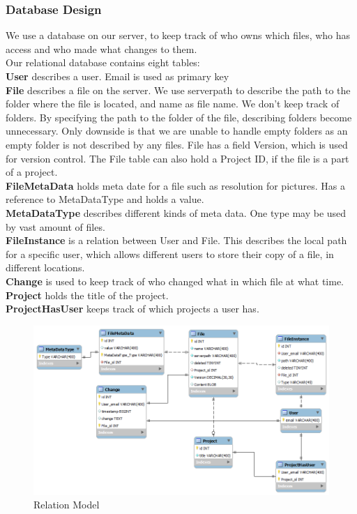 \subsubsection{Database Design}
We use a database on our server, to keep track of who owns which files, who has access and who made what changes to them.\\
Our relational database contains eight tables:\\
\textbf{User} describes a user. Email is used as primary key\\
\textbf{File} describes a file on the server. We use serverpath to describe the path to the folder where the file is located, and name as file name. We don't keep track of folders. By specifying the path to the folder of the file, describing folders become unnecessary. Only downside is that we are unable to handle empty folders as an empty folder is not described by any files. File has a field Version, which is used for version control. The File table can also hold a Project ID, if the file is a part of a project.\\
\textbf{FileMetaData} holds meta date for a file such as resolution for pictures. Has a reference to MetaDataType and holds a value.\\
\textbf{MetaDataType} describes different kinds of meta data. One type may be used by vast amount of files.\\
\textbf{FileInstance} is a relation between User and File. This describes the local path for a specific user, which allows different users to store their copy of a file, in different locations.\\
\textbf{Change} is used to keep track of who changed what in which file at what time.\\
\textbf{Project} holds the title of the project.\\
\textbf{ProjectHasUser} keeps track of which projects a user has.\\
\begin{figure}[H]
  \includegraphics[width=\textwidth]{illustrations/workbench.png}
  \caption{Relation Model}
  \label{relationalmodel2}
\end{figure}
